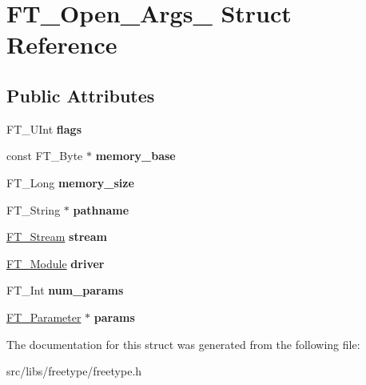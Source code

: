 \hypertarget{struct_f_t___open___args__}{
\section{FT\_\-Open\_\-Args\_\- Struct Reference}
\label{struct_f_t___open___args__}
}
\subsection*{Public Attributes}
\begin{DoxyCompactItemize}
\item 
\hypertarget{struct_f_t___open___args___a2e3e6b9284fe8b4d9833e247a19181fa}{
FT\_\-UInt {\bfseries flags}}
\label{struct_f_t___open___args___a2e3e6b9284fe8b4d9833e247a19181fa}

\item 
\hypertarget{struct_f_t___open___args___a1231da51bc58922096b3bc603bb2ffb0}{
const FT\_\-Byte $\ast$ {\bfseries memory\_\-base}}
\label{struct_f_t___open___args___a1231da51bc58922096b3bc603bb2ffb0}

\item 
\hypertarget{struct_f_t___open___args___a87f0bb2f257abe94c93a79e0de3525da}{
FT\_\-Long {\bfseries memory\_\-size}}
\label{struct_f_t___open___args___a87f0bb2f257abe94c93a79e0de3525da}

\item 
\hypertarget{struct_f_t___open___args___aea3d454d9fd9bb7434aad07e651d027b}{
FT\_\-String $\ast$ {\bfseries pathname}}
\label{struct_f_t___open___args___aea3d454d9fd9bb7434aad07e651d027b}

\item 
\hypertarget{struct_f_t___open___args___ae1e6444bf0c21b323ce6cbe8bc475b2b}{
\hyperlink{struct_f_t___stream_rec__}{FT\_\-Stream} {\bfseries stream}}
\label{struct_f_t___open___args___ae1e6444bf0c21b323ce6cbe8bc475b2b}

\item 
\hypertarget{struct_f_t___open___args___a7c01bd7e34a440c3e89141ee521e2646}{
\hyperlink{struct_f_t___module_rec__}{FT\_\-Module} {\bfseries driver}}
\label{struct_f_t___open___args___a7c01bd7e34a440c3e89141ee521e2646}

\item 
\hypertarget{struct_f_t___open___args___afaf47d9e1631f2147b696fd7f5a6f4eb}{
FT\_\-Int {\bfseries num\_\-params}}
\label{struct_f_t___open___args___afaf47d9e1631f2147b696fd7f5a6f4eb}

\item 
\hypertarget{struct_f_t___open___args___a77b279a34beba29bc14901926f79818f}{
\hyperlink{struct_f_t___parameter__}{FT\_\-Parameter} $\ast$ {\bfseries params}}
\label{struct_f_t___open___args___a77b279a34beba29bc14901926f79818f}

\end{DoxyCompactItemize}


The documentation for this struct was generated from the following file:\begin{DoxyCompactItemize}
\item 
src/libs/freetype/freetype.h\end{DoxyCompactItemize}
